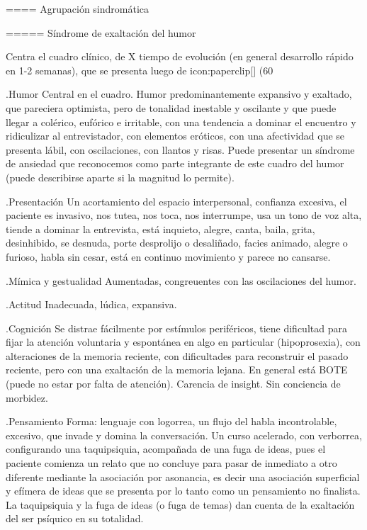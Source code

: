 \documentclass[encares.tex]{subfiles}
\begin{document}
==== Agrupación sindromática

===== Síndrome de exaltación del humor

Centra el cuadro clínico, de X tiempo de evolución (en general desarrollo rápido en 1-2 semanas), que se presenta luego de icon:paperclip[] (60%

.Humor
Central en el cuadro. Humor predominantemente expansivo y exaltado, que pareciera optimista, pero de tonalidad inestable y oscilante y que puede llegar a colérico, eufórico e irritable, con una tendencia a dominar el encuentro y ridiculizar al entrevistador, con elementos eróticos, con una afectividad que se presenta lábil, con oscilaciones, con llantos y risas. Puede presentar un síndrome de ansiedad que reconocemos como parte integrante de este cuadro del humor (puede describirse aparte si la magnitud lo permite).

.Presentación
Un acortamiento del espacio interpersonal, confianza excesiva, el paciente es invasivo, nos tutea, nos toca, nos interrumpe, usa un tono de voz alta, tiende a dominar la entrevista, está inquieto, alegre, canta, baila, grita, desinhibido, se desnuda, porte desprolijo o desaliñado, facies animado, alegre o furioso, habla sin cesar, está en continuo movimiento y parece no cansarse.

.Mímica y gestualidad
Aumentadas, congreuentes con las oscilaciones del humor.

.Actitud
Inadecuada, lúdica, expansiva.

.Cognición
Se distrae fácilmente por estímulos periféricos, tiene dificultad para fijar la atención voluntaria y espontánea en algo en particular (hipoprosexia), con alteraciones de la memoria reciente, con dificultades para reconstruir el pasado reciente, pero con una exaltación de la memoria lejana. En general está BOTE (puede no estar por falta de atención). Carencia de insight. Sin conciencia de morbidez.

.Pensamiento
Forma: lenguaje con logorrea, un flujo del habla incontrolable, excesivo, que invade y domina la conversación. Un curso acelerado, con verborrea, configurando una taquipsiquia, acompañada de una fuga de ideas, pues el paciente comienza un relato que no concluye para pasar de inmediato a otro diferente mediante la asociación por asonancia, es decir una asociación superficial y efímera de ideas que se presenta por lo tanto como un pensamiento no finalista. La taquipsiquia y la fuga de ideas (o fuga de temas) dan cuenta de la exaltación del ser psíquico en su totalidad.
\end{document}
